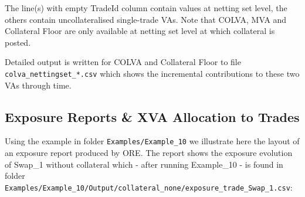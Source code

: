 The line(s) with empty TradeId column contain values at netting set level, the others contain uncollateralised
single-trade VAs.  Note that COLVA, MVA and Collateral Floor are only available at netting set level at which collateral
is posted.

\medskip
Detailed output is written for COLVA and Collateral Floor to file {\tt colva\_nettingset\_*.csv} which shows the
incremental contributions to these two VAs through time.


\subsection*{Exposure Reports \& XVA Allocation to Trades}
Using the example in folder {\tt Examples/Example\_10} we illustrate here the layout of an exposure report produced by
ORE. The report shows the exposure evolution of Swap\_1 without collateral which - after running Example\_10 - is found
in folder \\
{\tt Examples/Example\_10/Output/collateral\_none/exposure\_trade\_Swap\_1.csv}:

\begin{center}
\end{center}

